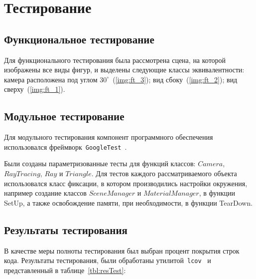 \clearpage
\section{Тестирование}

\subsection{Функциональное тестирование}
Для функционального тестирования была рассмотрена сцена, на которой изображены все виды фигур, и выделены следующие классы эквивалентности: камера расположена под углом $30^\circ$~(\ref{img:ft_3}); вид сбоку~(\ref{img:ft_2}); вид сверху~(\ref{img:ft_1}).

\FloatBarrier
{}
\FloatBarrier
{}
\FloatBarrier
{}
\FloatBarrier

\subsection{Модульное тестирование}
Для модульного тестирования компонент программного обеспечения использовался фреймворк~\texttt{GoogleTest}~\cite{gtest}. 

Были созданы параметризованные тесты для функций классов: $Camera$, $RayTracing$, $Ray$ и $Triangle$. Для тестов каждого рассматриваемого объекта использовался класс фиксации, в котором производились настройки окружения, например создание классов $SceneManager$ и $MaterialManager$, в функции SetUp, а также освобождение памяти, при необходимости, в функции TearDown.


\subsection{Результаты тестирования}

В качестве меры полноты тестирования был выбран процент покрытия строк кода. Результаты тестирования, были обработаны утилитой~\texttt{lcov}~\cite{lcov} и представленный в таблице~\ref{tbl:resTest}:

